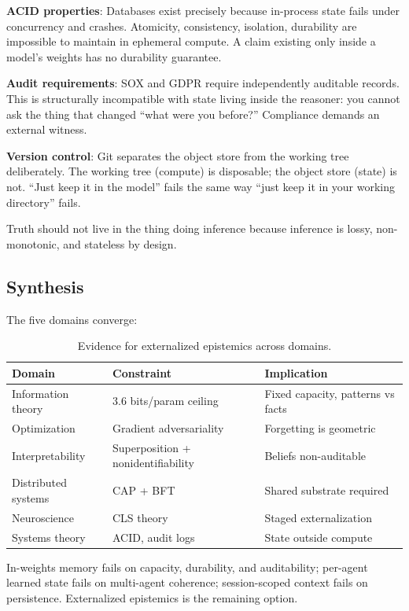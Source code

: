 \documentclass[11pt,letterpaper]{article}
\begin{document}
\textbf{ACID properties}: Databases exist precisely because in-process state fails under concurrency and crashes. Atomicity, consistency, isolation, durability are impossible to maintain in ephemeral compute. A claim existing only inside a model's weights has no durability guarantee.

\textbf{Audit requirements}: SOX and GDPR require independently auditable records. This is structurally incompatible with state living inside the reasoner: you cannot ask the thing that changed ``what were you before?'' Compliance demands an external witness.

\textbf{Version control}: Git separates the object store from the working tree deliberately. The working tree (compute) is disposable; the object store (state) is not. ``Just keep it in the model'' fails the same way ``just keep it in your working directory'' fails.

Truth should not live in the thing doing inference because inference is lossy, non-monotonic, and stateless by design.

\subsection{Synthesis}

The five domains converge:

\begin{table}[H]
\centering
\caption{Evidence for externalized epistemics across domains.}
\label{tab:evidence}
\begin{tabular}{@{}lll@{}}
\toprule
\textbf{Domain} & \textbf{Constraint} & \textbf{Implication} \\
\midrule
Information theory & 3.6 bits/param ceiling & Fixed capacity, patterns vs facts \\
Optimization & Gradient adversariality & Forgetting is geometric \\
Interpretability & Superposition + nonidentifiability & Beliefs non-auditable \\
Distributed systems & CAP + BFT & Shared substrate required \\
Neuroscience & CLS theory & Staged externalization \\
Systems theory & ACID, audit logs & State outside compute \\
\bottomrule
\end{tabular}
\end{table}

In-weights memory fails on capacity, durability, and auditability; per-agent learned state fails on multi-agent coherence; session-scoped context fails on persistence. Externalized epistemics is the remaining option.
\end{document}
